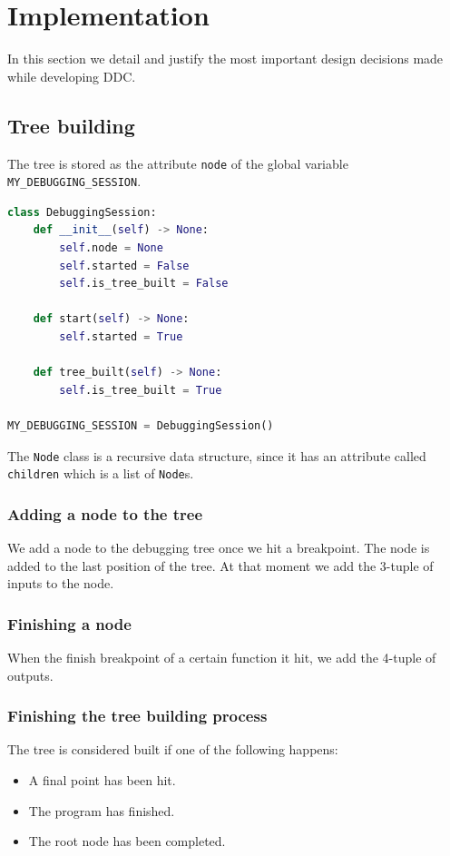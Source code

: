 \section{Implementation}
In this section we detail and justify the most important design decisions made while developing DDC.
\subsection{Tree building}
The tree is stored as the attribute \verb|node| of the global variable \verb|MY_DEBUGGING_SESSION|.
\begin{lstlisting}[language=Python, caption=DebuggingSession class and global object]
class DebuggingSession:
    def __init__(self) -> None:
        self.node = None
        self.started = False
        self.is_tree_built = False

    def start(self) -> None:
        self.started = True

    def tree_built(self) -> None:
        self.is_tree_built = True

MY_DEBUGGING_SESSION = DebuggingSession()
\end{lstlisting}
The \verb|Node| class is a recursive data structure, since it has an attribute called \verb|children| which is a list of \verb|Node|s.
\subsubsection{Adding a node to the tree}
We add a node to the debugging tree once we hit a breakpoint.
The node is added to the last position of the tree.
At that moment we add the 3-tuple of inputs to the node.
\subsubsection{Finishing a node}
When the finish breakpoint of a certain function it hit, we add the 4-tuple of outputs.
\subsubsection{Finishing the tree building process}
The tree is considered built if one of the following happens:
\begin{itemize}
    \item A final point has been hit.
    \item The program has finished.
    \item The root node has been completed.
\end{itemize}
